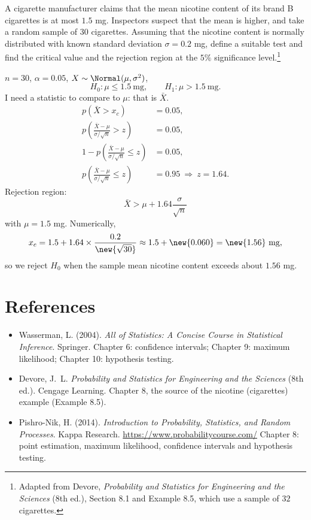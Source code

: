 \begin{example}[Cigarettes]
A cigarette manufacturer claims that the mean nicotine content of its brand B cigarettes is at most $1.5$ mg. Inspectors suspect that the mean is higher, and take a random sample of $30$ cigarettes. Assuming that the nicotine content is normally distributed with known standard deviation $\sigma = 0.2$ mg, define a suitable test and find the critical value and the rejection region at the $5\%$ significance level.\footnote{Adapted from Devore, \emph{Probability and Statistics for Engineering and the Sciences} (8th ed.), Section 8.1 and Example 8.5, which use a sample of $32$ cigarettes.}

$n = 30$, $\alpha = 0.05$, $X \sim \Normal(\mu, \sigma^2)$,
\[
H_0: \mu \le 1.5\ \text{mg}, \qquad H_1: \mu > 1.5\ \text{mg}.
\]
I need a statistic to compare to $\mu$: that is $\bar X$.
\begin{align*}
p(\bar X > x_c) &= 0.05,\\
p\left(\frac{\bar X - \mu}{\sigma/\sqrt n} > z\right) &= 0.05,\\
1 - p\left(\frac{\bar X - \mu}{\sigma/\sqrt n} \le z\right) &= 0.05,\\
p\left(\frac{\bar X - \mu}{\sigma/\sqrt n} \le z\right) &= 0.95 \ \Rightarrow\ z = 1.64.
\end{align*}
Rejection region:
\[
\boxed{\bar X > \mu + 1.64\frac{\sigma}{\sqrt n}}
\]
with $\mu = 1.5$ mg. Numerically,
\[
x_c = 1.5 + 1.64\times\frac{0.2}{\new{\sqrt{30}}} \approx 1.5 + \new{0.060} = \new{1.56}\ \text{mg},
\]
so we reject $H_0$ when the sample mean nicotine content exceeds about $1.56$ mg.
\end{example}

\section*{References}
\begin{itemize}
\item Wasserman, L. (2004). \emph{All of Statistics: A Concise Course in Statistical Inference}. Springer. Chapter 6: confidence intervals; Chapter 9: maximum likelihood; Chapter 10: hypothesis testing.
\item Devore, J.~L. \emph{Probability and Statistics for Engineering and the Sciences} (8th ed.). Cengage Learning. Chapter 8, the source of the nicotine (cigarettes) example (Example 8.5).
\item Pishro-Nik, H. (2014). \emph{Introduction to Probability, Statistics, and Random Processes}. Kappa Research. \url{https://www.probabilitycourse.com/} Chapter 8: point estimation, maximum likelihood, confidence intervals and hypothesis testing.
\end{itemize}


